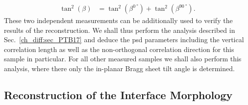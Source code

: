 \begin{align}
 \tan^2(\beta) &= \tan^2(\beta^{\SI{0}{\degree}}) + \tan^2(\beta^{\SI{90}{\degree}}) \text{.} \label{ch_diff:eqn_total_beta}
\end{align}
These two independent measurements can be additionally used to verify the results of the reconstruction. We shall thus perform the analysis described in Sec.~\ref{ch_diff:sec_PTB17} and deduce the \gls{psd} parameters including the vertical correlation length as well as the non-orthogonal correlation direction for this sample in particular. For all other measured samples we shall also perform this analysis, where there only the in-planar Bragg sheet tilt angle is determined.

\subsection{Reconstruction of the Interface Morphology}
